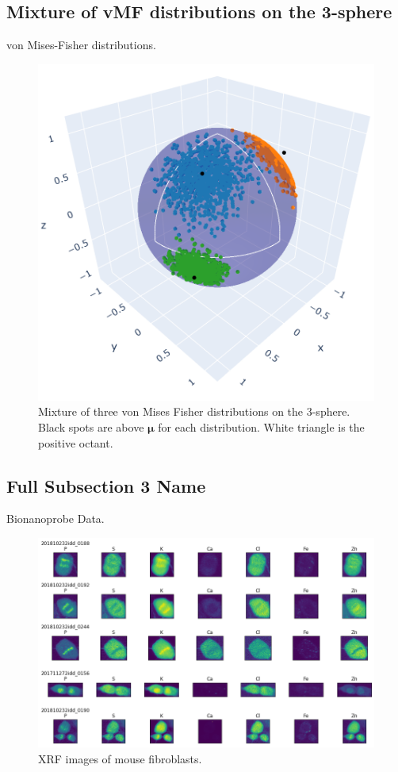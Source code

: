 \documentclass[
]{beamer}
\begin{document}
\subsection[movMF image]{Mixture of vMF distributions on the 3-sphere}
\begin{frame}{von Mises-Fisher distributions.}
\begin{figure}[h]
  \includegraphics[width=.5\textwidth,height=.5\textheight,keepaspectratio]{vMF.png}
  \caption{Mixture of three von Mises Fisher distributions on the 3-sphere. Black spots are above $\boldsymbol{\mu}$ for each distribution. White triangle is the positive octant.
  }
\end{figure}
\end{frame}

\subsection[Short Subsection 3 Name]{Full Subsection 3 Name}

\begin{frame}{Bionanoprobe Data.}
\begin{figure}[h]
  \includegraphics[width=1\textwidth,height=1\textheight,keepaspectratio]{BNP.png}
  \caption{XRF images of mouse fibroblasts.
  }
\end{figure}
\end{frame}
\end{document}
